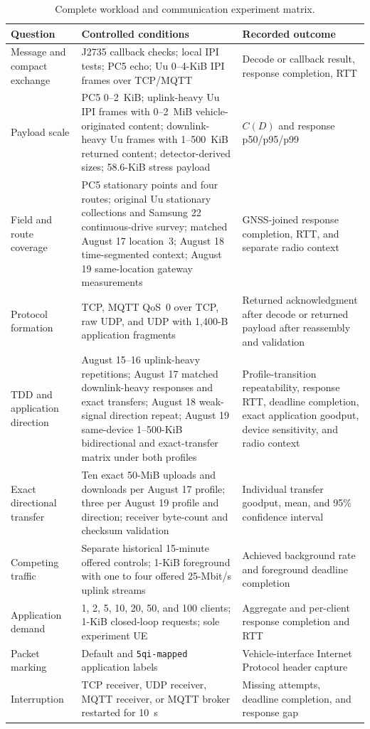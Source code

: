 \begin{table}[t]
  \caption{Complete workload and communication experiment matrix.}
  \label{tab:experiment-matrix}
  \centering
  \scriptsize
  \setlength{\tabcolsep}{2.7pt}
  \begin{tabular}{@{}p{}p{}p{}@{}}
    \toprule
    Question & Controlled conditions & Recorded outcome \\
    \midrule
    Message and compact exchange & J2735 callback checks; local IPI tests; PC5 echo; Uu 0--4-KiB IPI frames over TCP/MQTT & Decode or callback result, response completion, RTT \\
    Payload scale & PC5 0--2~KiB; uplink-heavy Uu IPI frames with 0--2~MiB vehicle-originated content; downlink-heavy Uu frames with 1--500~KiB returned content; detector-derived sizes; 58.6-KiB stress payload & $C(D)$ and response p50/p95/p99 \\
    Field and route coverage & PC5 stationary points and four routes; original Uu stationary collections and Samsung 22 continuous-drive survey; matched August 17 location~3; August 18 time-segmented context; August 19 same-location gateway measurements & GNSS-joined response completion, RTT, and separate radio context \\
    Protocol formation & TCP, MQTT QoS~0 over TCP, raw UDP, and UDP with 1,400-B application fragments & Returned acknowledgment after decode or returned payload after reassembly and validation \\
    TDD and application direction & August 15--16 uplink-heavy repetitions; August 17 matched downlink-heavy responses and exact transfers; August 18 weak-signal direction repeat; August 19 same-device 1--500-KiB bidirectional and exact-transfer matrix under both profiles & Profile-transition repeatability, response RTT, deadline completion, exact application goodput, device sensitivity, and radio context \\
    Exact directional transfer & Ten exact 50-MiB uploads and downloads per August 17 profile; three per August 19 profile and direction; receiver byte-count and checksum validation & Individual transfer goodput, mean, and 95\% confidence interval \\
    Competing traffic & Separate historical 15-minute offered controls; 1-KiB foreground with one to four offered 25-Mbit/s uplink streams & Achieved background rate and foreground deadline completion \\
    Application demand & 1, 2, 5, 10, 20, 50, and 100 clients; 1-KiB closed-loop requests; sole experiment UE & Aggregate and per-client response completion and RTT \\
    Packet marking & Default and \texttt{5qi-mapped} application labels & Vehicle-interface Internet Protocol header capture \\
    Interruption & TCP receiver, UDP receiver, MQTT receiver, or MQTT broker restarted for 10~s & Missing attempts, deadline completion, and response gap \\
    \bottomrule
  \end{tabular}
\end{table}


